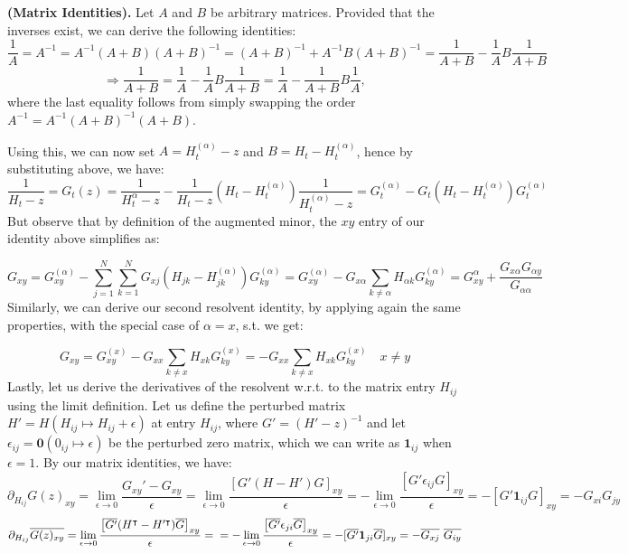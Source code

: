 \documentclass[11pt]{article}
\newenvironment{boxt}[1]
  {\begin{mdframed}\noindent\textbf{#1}\normalfont\space}
  {\end{mdframed}}
\begin{document}
\begin{boxt}{(Matrix Identities).}
Let $A$ and $B$ be arbitrary matrices. Provided that the inverses exist, we can derive the following identities: 
$$\frac{1}{A}=A^{-1} =A^{-1}(A+B)(A+B)^{-1}=(A+B)^{-1}+A^{-1}B(A+B)^{-1} = \frac{1}{A+B}-\frac{1}{A}B\frac{1}{A+B}$$
$$\Rightarrow \frac{1}{A+B}=\frac{1}{A}-\frac{1}{A}B\frac{1}{A+B} = \frac{1}{A}-\frac{1}{A+B}B\frac{1}{A},$$
where the last equality follows from simply swapping the order $A^{-1}=A^{-1}(A+B)^{-1}(A+B)$. \end{boxt}

\noindent Using this, we can now set $A = H_t^{(\alpha)}-z$ and $B  = H_t-H_t^{(\alpha)}$, hence by substituting above, we have: $$\frac{1}{H_t-z} = G_{t}(z) = \frac{1}{H_t^{\alpha}-z}-\frac{1}{H_t-z}\left(H_t-H_t^{(\alpha)}\right)\frac{1}{H_t^{(\alpha)}-z} = G^{(\alpha)}_t-G_t(H_t-H_t^{(\alpha)})G_t^{(\alpha)}$$
But observe that by definition of the augmented minor, the $xy$ entry of our identity above simplifies as: 

\begin{equation*}
G_{xy}=G_{xy}^{(\alpha)}-\sum_{j=1}^N\sum_{k=1}^NG_{xj}(H_{jk}-H^{(\alpha)}_{jk})G_{ky}^{(\alpha)} = G_{xy}^{(\alpha)} - G_{x\alpha}\sum_{k\neq \alpha} H_{\alpha k}G_{ky}^{(\alpha)} = G_{xy}^{\alpha}+\frac{G_{x\alpha}G_{\alpha y}}{G_{\alpha\alpha}}
\end{equation*}
Similarly, we can derive our second resolvent identity, by applying again the same properties, with the special case of $\alpha = x$, s.t. we get:

\begin{equation*}
G_{xy} = G_{xy}^{(x)} - G_{xx}\sum_{k\neq x}H_{xk}G_{ky}^{(x)} =- G_{xx}\sum_{k\neq x}H_{xk}G_{ky}^{(x)}\quad x\neq y
\end{equation*}
Lastly, let us derive the derivatives of the resolvent w.r.t. to the matrix entry $H_{ij}$ using the limit definition. Let us define the perturbed matrix $H' = H(H_{ij}\mapsto H_{ij}+\epsilon)$ at entry $H_{ij}$, where $G' = (H'-z)^{-1}$ and let $\epsilon_{ij} = \mathbf{0}(0_{ij}\mapsto \epsilon)$ be the perturbed zero matrix, which we can write as $\mathbf{1}_{ij}$ when $\epsilon=1$. By our matrix identities, we have: $$\partial_{H_{ij}}G(z)_{xy}=\lim_{\epsilon\rightarrow 0} \frac{G_{xy}'-G_{xy}}{\epsilon} = \lim_{\epsilon\rightarrow 0}\frac{\left[G'(H-H')G\right]_{xy}}{\epsilon} = -\lim_{\epsilon\rightarrow 0}\frac{\left[G'\epsilon_{ij}G\right]_{xy}}{\epsilon} = -[G'\mathbf{1}_{ij}G]_{xy} = -G_{xi}G_{jy}$$
\begin{equation*}
\partial_{H_{ij}}\overline{G(z)_{xy}}= \lim_{\epsilon\rightarrow 0}\frac{\left[\overline{G'}(H^\intercal-H'^\intercal)\overline{G}\right]_{xy}}{\epsilon} =\\\\= -\lim_{\epsilon\rightarrow 0}\frac{\left[\overline{G'}\epsilon_{ji}\overline{G}\right]_{xy}}{\epsilon} = -[\overline{G'}\mathbf{1}_{ji}\overline{G}]_{xy} = -\overline{G_{xj}}\ \overline{G_{iy}}
\end{equation*}
\end{document}

